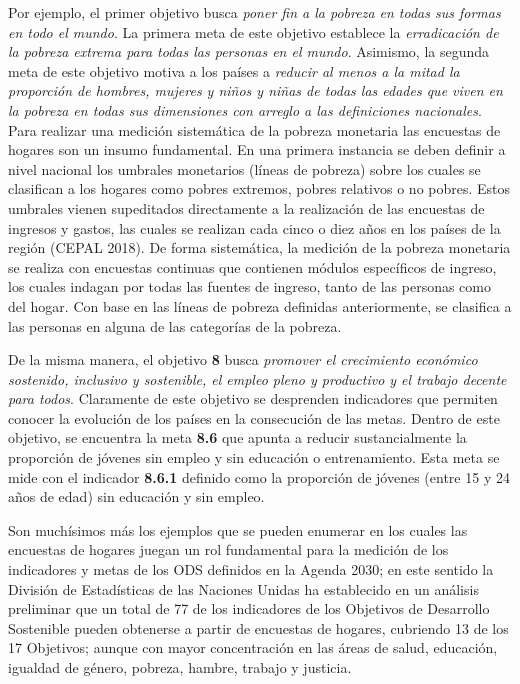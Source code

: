 \documentclass[
  12pt,
]{book}
\begin{document}
Por ejemplo, el primer objetivo busca \emph{poner fin a la pobreza en todas sus formas en todo el mundo}. La primera meta de este objetivo establece la \emph{erradicación de la pobreza extrema para todas las personas en el mundo}. Asimismo, la segunda meta de este objetivo motiva a los países a \emph{reducir al menos a la mitad la proporción de hombres, mujeres y niños y niñas de todas las edades que viven en la pobreza en todas sus dimensiones con arreglo a las definiciones nacionales}. Para realizar una medición sistemática de la pobreza monetaria las encuestas de hogares son un insumo fundamental. En una primera instancia se deben definir a nivel nacional los umbrales monetarios (líneas de pobreza) sobre los cuales se clasifican a los hogares como pobres extremos, pobres relativos o no pobres. Estos umbrales vienen supeditados directamente a la realización de las encuestas de ingresos y gastos, las cuales se realizan cada cinco o diez años en los países de la región (CEPAL 2018). De forma sistemática, la medición de la pobreza monetaria se realiza con encuestas continuas que contienen módulos específicos de ingreso, los cuales indagan por todas las fuentes de ingreso, tanto de las personas como del hogar. Con base en las líneas de pobreza definidas anteriormente, se clasifica a las personas en alguna de las categorías de la pobreza.

De la misma manera, el objetivo \textbf{8} busca \emph{promover el crecimiento económico sostenido, inclusivo y sostenible, el empleo pleno y productivo y el trabajo decente para todos}. Claramente de este objetivo se desprenden indicadores que permiten conocer la evolución de los países en la consecución de las metas. Dentro de este objetivo, se encuentra la meta \textbf{8.6} que apunta a reducir sustancialmente la proporción de jóvenes sin empleo y sin educación o entrenamiento. Esta meta se mide con el indicador \textbf{8.6.1} definido como la proporción de jóvenes (entre 15 y 24 años de edad) sin educación y sin empleo.

Son muchísimos más los ejemplos que se pueden enumerar en los cuales las encuestas de hogares juegan un rol fundamental para la medición de los indicadores y metas de los ODS definidos en la Agenda 2030; en este sentido la División de Estadísticas de las Naciones Unidas ha establecido en un análisis preliminar que un total de 77 de los indicadores de los Objetivos de Desarrollo Sostenible pueden obtenerse a partir de encuestas de hogares, cubriendo 13 de los 17 Objetivos; aunque con mayor concentración en las áreas de salud, educación, igualdad de género, pobreza, hambre, trabajo y justicia.
\end{document}
